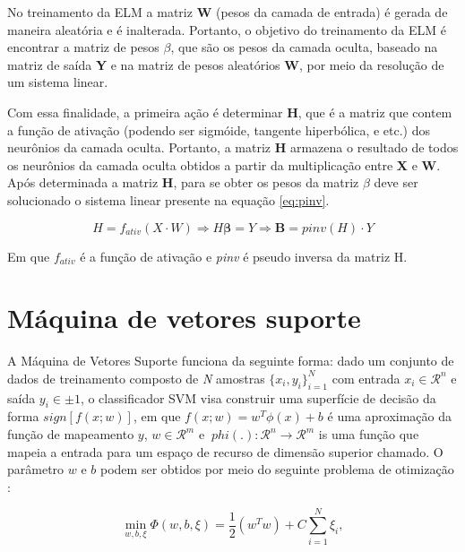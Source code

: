 No treinamento da ELM a matriz \textbf{W} (pesos da camada de entrada) é gerada de maneira aleatória e é inalterada. Portanto, o objetivo do treinamento da ELM é encontrar a matriz de pesos $\beta$, que são os pesos da camada oculta, baseado na matriz de saída \textbf{Y} e na matriz de pesos aleatórios \textbf{W}, por meio da resolução de um sistema linear. 

Com essa finalidade, a primeira ação é determinar \textbf{H}, que é a matriz que contem a função de ativação (podendo ser sigmóide, tangente hiperbólica, e etc.) dos neurônios da camada oculta.  Portanto, a matriz \textbf{H} armazena o resultado de todos os neurônios da camada oculta obtidos a partir da multiplicação entre \textbf{X} e \textbf{W}. Após determinada a matriz \textbf{H}, para se obter os pesos da matriz $\beta$ deve ser solucionado o sistema linear presente na equação \ref{eq:pinv}.


\begin{equation}
H = f_{ativ}(X\cdot W) \Rightarrow H\boldsymbol{\mathbf{\beta}} = Y \Rightarrow \mathbf{\mathbf{B}} = pinv(H)\cdot Y
\label{eq:pinv}
\end{equation}

Em que $f_{ativ}$ é a função de ativação e \textit{pinv} é pseudo inversa da matriz H. 



\section{Máquina de vetores suporte}
A Máquina de Vetores Suporte \cite{cortes1995support}  funciona da seguinte forma: dado um conjunto de dados de treinamento composto de \textit{N} amostras $\{x_i, y_i \}_{i = 1} ^ N $ com entrada $ x_i \in \mathcal{R}^n$ e saída $y_i \in \pm 1 $, o classificador SVM visa construir uma superfície de decisão da forma $ sign [f (x; w)] $, em que 
$ f (x; w) = w ^ T \phi (x) + b $
é uma aproximação da função de mapeamento $ y $, $ w \in \mathcal {R} ^ m $ e $ \ phi (.): \mathcal {R}^n \rightarrow \mathcal {R}^m $ is uma função que mapeia a entrada para um espaço de recurso de dimensão superior chamado. O parâmetro $ w $ e $ b $ podem ser obtidos por meio do seguinte problema de otimização \cite{Vapnik}:

\begin{equation}
\label {eq: rule1}
\min_ {w, b, \xi} \Phi (w, b, \xi) = \frac{1}{2} (w^Tw) + C \sum_ {i = 1} ^ N \xi_i,
\end{equation}

